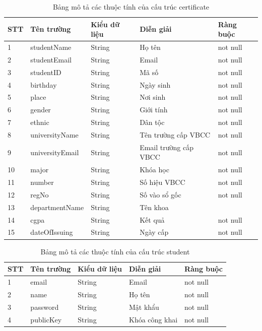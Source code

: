 \begin{table}[H]
\caption{Bảng mô tả các thuộc tính của cấu trúc certificate}
	\label{table:certificate}
	\begin{tabularx} {\textwidth} {|p{1cm}|p{3cm}|p{3cm}|X|p{2cm}|}
\hline
		STT &	Tên trường & Kiểu dữ liệu & Diễn giải & Ràng buộc \\ \hline
		1 & studentName	& String & Họ tên  & not null \\ \hline
		2 & studentEmail & String  & Email   & not null \\ \hline
		3 & studentID	&  String & Mã số  & not null\\ \hline
		4 & birthday	& String & Ngày sinh & not null\\ \hline
		5 & place	& String & Nơi sinh & not null\\ \hline
		6 & gender & String & Giới tính & not null\\ \hline
		7& ethnic	& String & Dân tộc & not null\\ \hline
		8& universityName	& String & Tên trường cấp VBCC & not null \\ \hline
		9& universityEmail	& String & Email trường cấp VBCC&not null\\ \hline
		10& major 	& String & Khóa  học  & not null\\ \hline
		11& number	& String & Số hiệu VBCC & not null\\ \hline
		12& regNo	& String & Số vào sổ gốc & not null \\ \hline
		13& departmentName	& String & Tên khoa &\\ \hline
		14& cgpa	& String & Kết quả & not null \\  \hline
		15& dateOfIssuing	& String & Ngày cấp &not null\\ \hline
		
\end{tabularx}
\end{table}


\begin{table}[H]
\caption{Bảng mô tả các thuộc tính của cấu trúc student}
	\label{table:student}
	\begin{tabularx} {\textwidth} {|p{1cm}|p{3cm}|p{3cm}|X|p{2cm}|}
\hline
		STT &	Tên trường & Kiểu dữ liệu & Diễn giải & Ràng buộc \\ \hline
		1 & email	& String & Email  & not null \\ \hline
		2 & name & String  & Họ tên   & not null \\ \hline
		3 & password	&  String & Mật khẩu  & not null\\ \hline
		4 & publicKey	& String & Khóa công khai  & not null\\ \hline
\end{tabularx}
\end{table}


